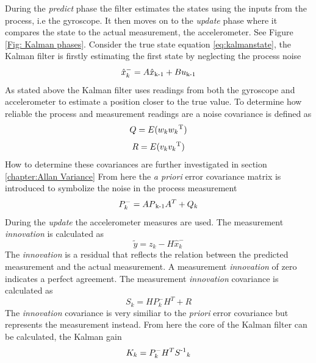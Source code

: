 \documentclass[a4paper,11pt]{kth-mag}
\begin{document}
During the \textit{predict} phase the filter estimates the states using the inputs from the process, i.e the gyroscope. It then moves on to the \textit{update} phase where it compares the state to the actual measurement, the accelerometer. See Figure \ref{Fig: Kalman phases}.
Consider the true state equation \eqref{eq:kalmanstate}, the Kalman filter is firstly estimating the first state by neglecting the process noise
\begin{equation} \label{eq:Kalman first estimate}
\hat{x}^-_k = A\hat{x}\textsubscript{k-1}+Bu\textsubscript{k-1}
\end{equation}
As stated above the Kalman filter uses readings from both the gyroscope and accelerometer to estimate a position closer to the true value. To determine how reliable the process and measurement readings are a noise covariance is defined as
\begin{equation} \label{eq:covariance process noise}
Q = E(w_k w_k \textsuperscript{T})
\end{equation}
\begin{equation} \label{eq:covariance measurement noise}
R = E(v_k v_k \textsuperscript{T} )
\end{equation}
How to determine these covariances are further investigated in section  \ref{chapter:Allan Variance}
From here the \textit{a priori} error covariance matrix is introduced to symbolize the noise in the process measurement
\begin{equation}
P^-_k = AP\textsubscript{k-1}A^T + Q_k
\end{equation}
During the \textit{update} the accelerometer measures are used. The measurement \textit{innovation} is calculated as
\begin{equation} \label{eq: innovation}
\tilde{y} = z_k - H\hat{x}^-_k
\end{equation}
The \textit{innovation} is a residual that reflects the relation between the predicted measurement and the actual measurement. A measurement \textit{innovation} of zero indicates a perfect agreement.
The measurement \textit{innovation} covariance is calculated as
\begin{equation} \label{eq:innovation cov}
S_k = HP^-_kH^T + R
\end{equation}
The \textit{innovation} covariance is very similiar to the \textit{priori} error covariance but represents the measurement instead. From here the core of the Kalman filter can be calculated, the Kalman gain
\begin{equation} \label{eq:Kalman gain}
K_k = P^-_kH^TS\textsuperscript{-1}_k
\end{equation}
\end{document}
